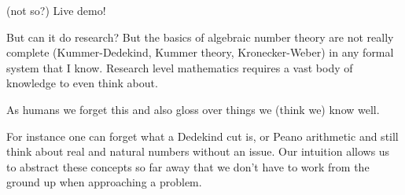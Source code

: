 \documentclass{beamer}
\theoremstyle{plain}
\begin{document}
{\begin{frame}[fragile]
\end{frame}

\begin{frame}{(not so?) Live demo!}
\end{frame}

\begin{frame}{But can it do research?}
    But the basics of algebraic number theory are not really complete (Kummer-Dedekind, Kummer theory, Kronecker-Weber) in any formal system that I know.
    Research level mathematics requires a vast body of knowledge to even think about.
    \pause

    As humans we forget this and also gloss over things we (think we) know well.
    \pause

    For instance one can forget what a Dedekind cut is, or Peano arithmetic and still think about real and natural numbers without an issue.
    Our intuition allows us to abstract these concepts so far away that we don't have to work from the ground up when approaching a problem.

\end{frame}}
\end{document}
